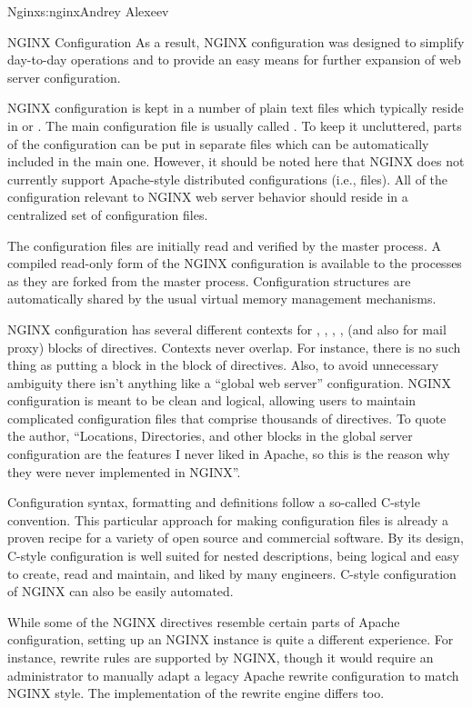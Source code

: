 \begin{aosachapter}{Nginx}{s:nginx}{Andrey Alexeev}
\begin{aosasect1}{NGINX Configuration}
As a result, NGINX configuration was designed to simplify day-to-day
operations and to provide an easy means for further expansion of web
server configuration.

NGINX configuration is kept in a number of plain text files which
typically reside in  or
. The main configuration file is usually called
. To keep it uncluttered, parts of the configuration
can be put in separate files which can be automatically included in
the main one. However, it should be noted here that NGINX does not
currently support Apache-style distributed configurations (i.e.,
 files). All of the configuration relevant to NGINX
web server behavior should reside in a centralized set of
configuration files.

The configuration files are initially read and verified by the master
process. A compiled read-only form of the NGINX configuration is
available to the  processes as they are forked from the
master process. Configuration structures are automatically shared by
the usual virtual memory management mechanisms.

NGINX configuration has several different contexts for ,
, , ,  (and also
 for mail proxy) blocks of directives. Contexts never
overlap. For instance, there is no such thing as putting a
 block in the  block of directives. Also, to
avoid unnecessary ambiguity there isn't anything like a ``global web
server'' configuration. NGINX configuration is meant to be clean and
logical, allowing users to maintain complicated configuration files
that comprise thousands of directives. To quote the author,
``Locations, Directories, and other blocks in the global server
configuration are the features I never liked in Apache, so this is the
reason why they were never implemented in NGINX''.

Configuration syntax, formatting and definitions follow a so-called
C-style convention. This particular approach for making configuration
files is already a proven recipe for a variety of open source and
commercial software. By its design, C-style configuration is well
suited for nested descriptions, being logical and easy to create, read
and maintain, and liked by many engineers. C-style configuration of
NGINX can also be easily automated.

While some of the NGINX directives resemble certain parts of Apache
configuration, setting up an NGINX instance is quite a different
experience. For instance, rewrite rules are supported by NGINX, though
it would require an administrator to manually adapt a legacy Apache
rewrite configuration to match NGINX style. The implementation of the
rewrite engine differs too.


\end{aosasect1}
\end{aosachapter}
